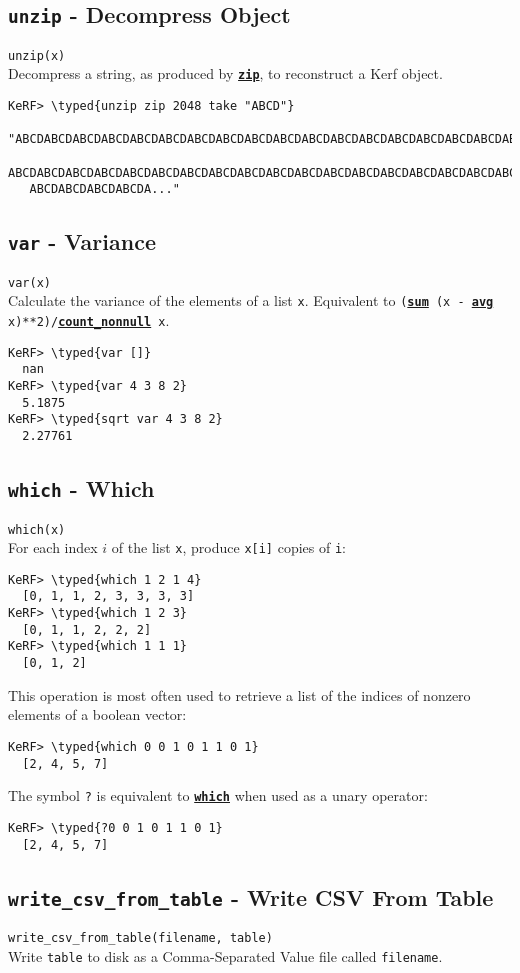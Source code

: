 \documentclass{article}
\newcommand{\typed}[1]{\textcolor{TealBlue}{#1}}
\newcommand{\primdefu}[3]{\subsection{\texttt{#1} - #2}\label{prim:#3}}
\newcommand{\primu}[2]{\hyperref[prim:#2]{\textbf{\texttt{#1}}}}
\newcommand{\primdef}[2]{\primdefu{#1}{#2}{#1}}
\newcommand{\prim}[1]{\primu{#1}{#1}}
\begin{document}
\primdef{unzip}{Decompress Object}
\texttt{unzip(x)}\\

Decompress a string, as produced by \prim{zip}, to reconstruct a Kerf object.
\begin{Verbatim}
KeRF> \typed{unzip zip 2048 take "ABCD"}
  "ABCDABCDABCDABCDABCDABCDABCDABCDABCDABCDABCDABCDABCDABCDABCDABCDABCDABCDABCDABCDABCDABCDABCD
   ABCDABCDABCDABCDABCDABCDABCDABCDABCDABCDABCDABCDABCDABCDABCDABCDABCDABCDABCDABCDABCDABCDABCD
   ABCDABCDABCDABCDA..."
\end{Verbatim}

\primdef{var}{Variance}
\texttt{var(x)}\\

Calculate the variance of the elements of a list \texttt{x}. Equivalent to \texttt{(\prim{sum} (x - \prim{avg} x)**2)/\primu{count\_nonnull}{countNonnull} x}.
\begin{Verbatim}
KeRF> \typed{var []}
  nan
KeRF> \typed{var 4 3 8 2}
  5.1875
KeRF> \typed{sqrt var 4 3 8 2}
  2.27761
\end{Verbatim}

\primdef{which}{Which}
\texttt{which(x)}\\

For each index $i$ of the list \texttt{x}, produce \texttt{x[i]} copies of \texttt{i}:
\begin{Verbatim}
KeRF> \typed{which 1 2 1 4}
  [0, 1, 1, 2, 3, 3, 3, 3]
KeRF> \typed{which 1 2 3}
  [0, 1, 1, 2, 2, 2]
KeRF> \typed{which 1 1 1}
  [0, 1, 2]
\end{Verbatim}

This operation is most often used to retrieve a list of the indices of nonzero elements of a boolean vector:
\begin{Verbatim}
KeRF> \typed{which 0 0 1 0 1 1 0 1}
  [2, 4, 5, 7]
\end{Verbatim}

The symbol \texttt{?} is equivalent to \prim{which} when used as a unary operator:
\begin{Verbatim}
KeRF> \typed{?0 0 1 0 1 1 0 1}
  [2, 4, 5, 7]
\end{Verbatim}

\pagebreak
\primdefu{write\_csv\_from\_table}{Write CSV From Table}{writeCsvFromTable}
\texttt{write\_csv\_from\_table(filename, table)}\\

Write \texttt{table} to disk as a Comma-Separated Value file called \texttt{filename}.
\end{document}
